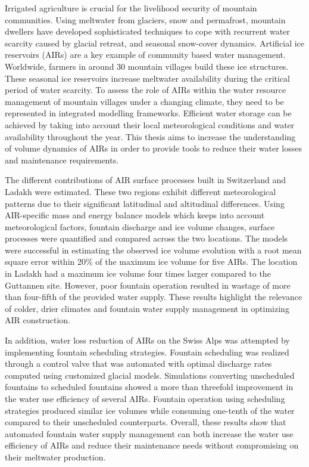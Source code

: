 \label{sec:summary}

Irrigated agriculture is crucial for the livelihood security of mountain communities. Using meltwater from
glaciers, snow and permafrost, mountain dwellers have developed sophisticated techniques to cope with recurrent
water scarcity caused by glacial retreat, and seasonal snow-cover dynamics. Artificial ice
reservoirs (AIRs) are a key example of community based water management. Worldwide, farmers in around 30 mountain
villages build these ice structures. These seasonal ice reservoirs increase meltwater availability during the
critical period of water scarcity. To assess the role of AIRs within the water resource management of
mountain villages under a changing climate, they need to be represented in integrated modelling frameworks.
Efficient water storage can be achieved by taking into account their local meteorological conditions and
water availability throughout the year. This thesis aims to increase the understanding of volume dynamics of
AIRs in order to provide tools to reduce their water losses and maintenance requirements.

The different contributions of AIR surface processes built in Switzerland and Ladakh were estimated. These two
regions exhibit different meteorological patterns due to their significant latitudinal and altitudinal
differences. Using AIR-specific mass and energy balance models which keeps into account meteorological factors,
fountain discharge and ice volume changes, surface processes were quantified and compared across the two
locations. The models were successful in estimating the observed ice volume evolution with a root mean square
error within 20\% of the maximum ice volume for five AIRs. The location in Ladakh had a maximum ice volume four
times larger compared to the Guttannen site. However, poor fountain operation resulted in wastage of more than
four-fifth of the provided water supply. These results highlight the relevance of colder, drier climates and
fountain water supply management in optimizing AIR construction.

In addition, water loss reduction of AIRs on the Swiss Alps was attempted by implementing fountain scheduling
strategies. Fountain scheduling was realized through a control valve that was automated with optimal discharge
rates computed using customized glacial models. Simulations converting unscheduled fountains to scheduled
fountains showed a more than threefold improvement in the water use efficiency of several AIRs. Fountain
operation using scheduling strategies produced similar ice volumes while consuming one-tenth of the water
compared to their unscheduled counterparts.  Overall, these results show that automated fountain water supply
management can both increase the water use efficiency of AIRs and reduce their maintenance needs without
compromising on their meltwater production.


